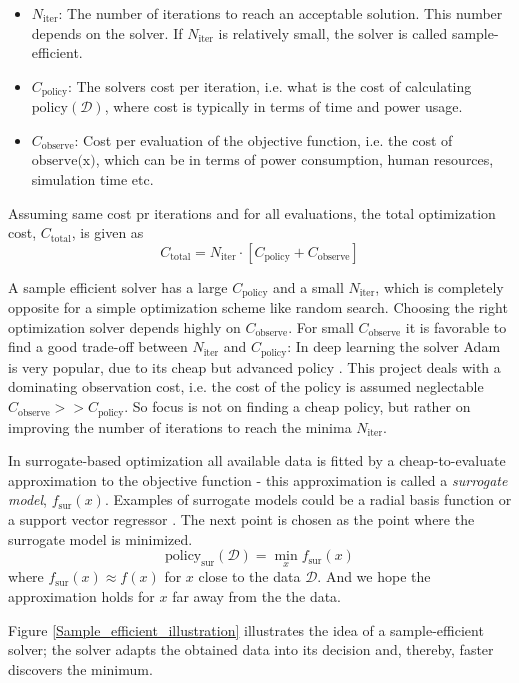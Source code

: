 \begin{itemize}[noitemsep]
    \item $N_{\text{iter}}$: The number of iterations to reach an acceptable solution. This number depends on the
    solver. If $N_{\text{iter}}$ is relatively small, the solver is called sample-efficient. 
    \item $C_{\text{policy}}$: The solvers cost per iteration, i.e. what is the cost of calculating
    $\text{policy}(\mathcal{D})$, where cost is typically in terms of time and power usage. 
    \item $C_{\text{observe}}$: Cost per evaluation of the objective function, i.e. the cost of $\text{observe(x)}$,
    which can be in terms of power consumption, human resources, simulation time etc.
\end{itemize}
Assuming same cost pr iterations and for all evaluations, the total optimization cost, $C_{\text{total}}$, is given as 
$$C_{\text{total}} = N_{\text{iter}} \cdot \left[ C_{\text{policy}} + C_{\text{observe}}\right]$$

A sample efficient solver has a large $C_{\text{policy}}$ and a small $N_{\text{iter}}$, which is
completely opposite for a simple optimization scheme like random search. Choosing the right optimization solver depends highly on $C_{\text{observe}}$.
For small $C_{\text{observe}}$ it is favorable to find a good trade-off between $N_{\text{iter}}$
and $C_{\text{policy}}$: In deep learning the solver Adam is very popular, due to its cheap
but advanced policy \cite{Adam}. This project deals with a dominating observation cost, i.e. the cost of the policy is assumed
neglectable $C_{\text{observe}}>>C_{\text{policy}}$. So focus is not on finding a cheap policy, but rather
on improving the number of iterations to reach the minima $N_{\text{iter}}$.

\begin{testexample}[Surrogate-based optimization]
    In surrogate-based optimization all available data is fitted by a cheap-to-evaluate
    approximation to the objective function - this approximation is called a \textit{surrogate
    model}, $f_{\text{sur}}(x)$. Examples of surrogate models could be a radial basis function or a
    support vector regressor \cite{deterministicsurrogatemodels}. The next point is chosen as the point where the surrogate model is
    minimized. 
    $$\text{policy}_{\text{sur}}(\mathcal{D}) = \min_x f_{\text{sur}}(x)$$
    where $f_{\text{sur}}(x) \approx f(x)$ for $x$ close to the data $\mathcal{D}$. And we hope the approximation
    holds for $x$ far away from the the data.
\end{testexample}
Figure \ref{Sample_efficient_illustration} illustrates the idea of a sample-efficient solver; the solver adapts
the obtained data into its decision and, thereby, faster discovers the minimum. 

